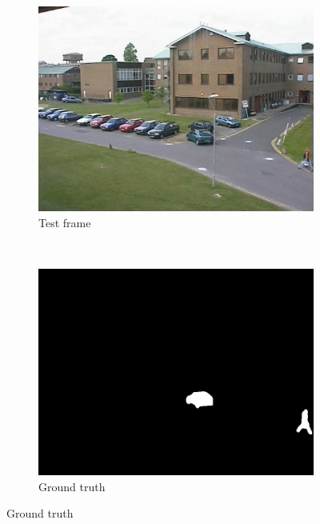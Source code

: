 \begin{figure}
        \centering
        \begin{subfigure}[b]{0.2\textwidth}
                \centering
                \includegraphics[width=\textwidth]{camReal.png}
                \caption{Test frame}
        \end{subfigure}%
        ~ %
        \begin{subfigure}[b]{0.2\textwidth}
                \centering
                \includegraphics[width=\textwidth]{camGT}
                \caption{Ground truth}
        \end{subfigure}
\end{figure}

